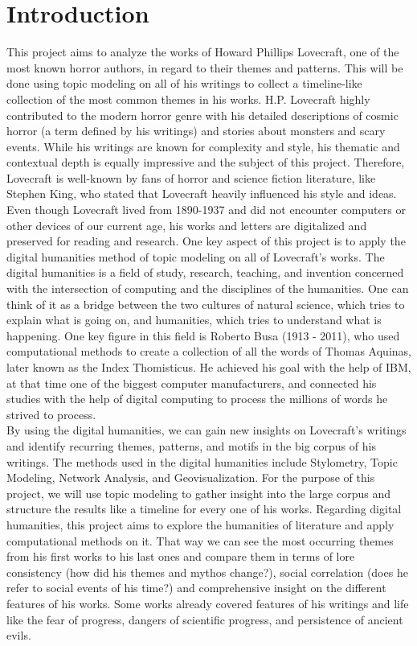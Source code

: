 \section{Introduction}

This project aims to analyze the works of Howard Phillips Lovecraft, one of the most known horror 
authors, in regard to their themes and patterns. This will be done using 
topic modeling on all of his writings to collect a timeline-like collection of the most common 
themes in his works. H.P. Lovecraft highly contributed to the modern horror genre with his 
detailed descriptions of cosmic horror (a term defined by his writings) and stories about 
monsters and scary events. While his writings are known for complexity and style, his thematic 
and contextual depth is equally impressive and the subject of this project. Therefore, Lovecraft 
is well-known by fans of horror and science fiction literature, like Stephen King, who stated 
that Lovecraft heavily influenced his style and ideas. \\

Even though Lovecraft lived from 1890-1937 and did not encounter computers or other devices of 
our current age, his works and letters are digitalized and preserved for reading and research. 
One key aspect of this project is to apply the digital humanities method of topic modeling on 
all of Lovecraft’s works. The digital humanities is a field of study, research, teaching, and 
invention concerned with the intersection of computing and the disciplines of the humanities. 
One can think of it as a bridge between the two cultures of natural science, which tries to 
explain what is going on, and humanities, which tries to understand what is happening. One key 
figure in this field is Roberto Busa (1913 - 2011), who used computational methods to create a 
collection of all the words of Thomas Aquinas, later known as the Index Thomisticus. He 
achieved his goal with the help of IBM, at that time one of the biggest computer manufacturers, 
and connected his studies with the help of digital computing to process the millions of words 
he strived to process.\\

By using the digital humanities, we can gain new insights on Lovecraft’s writings and identify 
recurring themes, patterns, and motifs in the big corpus of his writings. The methods used in 
the digital humanities include Stylometry, Topic Modeling, Network Analysis, and 
Geovisualization. For the purpose of this project, we will use topic modeling to gather 
insight into the large corpus and structure the results like a timeline for every one of 
his works. Regarding digital humanities, this project aims to explore the humanities of 
literature and apply computational methods on it. That way we can see the most occurring 
themes from his first works to his last ones and compare them in terms of lore consistency 
(how did his themes and mythos change?), social correlation (does he refer to social events 
of his time?) and comprehensive insight on the different features of his works. Some works 
already covered features of his writings and life like the fear of progress, dangers of 
scientific progress, and persistence of ancient evils.